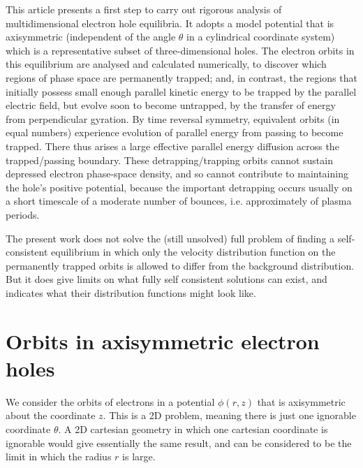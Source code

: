 \documentclass{agujournal2019}
\begin{document}
This article presents a first step to carry out rigorous analysis of
multidimensional electron hole equilibria. It adopts a model potential
that is axisymmetric (independent of the angle $\theta$ in a
cylindrical coordinate system) which is a representative subset of
three-dimensional holes. The electron orbits in this equilibrium are
analysed and calculated numerically, to discover which regions of
phase space are permanently trapped; and, in contrast, the regions
that initially possess small enough parallel kinetic energy to be
trapped by the parallel electric field, but evolve soon to become
untrapped, by the transfer of energy from perpendicular gyration. By
time reversal symmetry, equivalent orbits (in equal numbers)
experience evolution of parallel energy from passing to become
trapped. There thus arises a large effective parallel energy diffusion
across the trapped/passing boundary. These detrapping/trapping orbits
cannot sustain depressed electron phase-space density, and so cannot
contribute to maintaining the hole's positive potential, because
the important detrapping occurs usually on a short timescale of a
moderate number of bounces, i.e. approximately of plasma periods.

The present work does not solve the (still unsolved) full problem of
finding a self-consistent equilibrium in which only the velocity
distribution function on the permanently trapped orbits is allowed to
differ from the background distribution. But it does give limits on
what fully self consistent solutions can exist, and indicates what
their distribution functions might look like.


\section{Orbits in axisymmetric electron holes}

We consider the orbits of electrons in a potential $\phi(r,z)$ that is
axisymmetric about the coordinate $z$. This is a 2D problem, meaning
there is just one ignorable coordinate $\theta$. A 2D cartesian
geometry in which one cartesian coordinate is ignorable would give
essentially the same result, and can be considered to be the limit in
which the radius $r$ is large.
\end{document}
